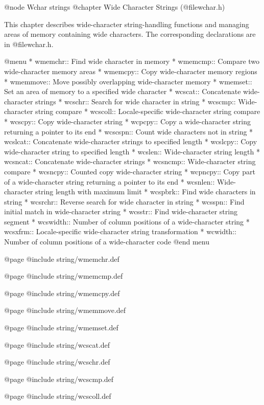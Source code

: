 @node Wchar strings
@chapter Wide Character Strings (@file{wchar.h})

This chapter describes wide-character string-handling functions and
managing areas of memory containing wide characters.  The corresponding 
declarations are in @file{wchar.h}.

@menu
* wmemchr::     Find wide character in memory
* wmemcmp::     Compare two wide-character memory areas
* wmemcpy::     Copy wide-character memory regions
* wmemmove::    Move possibly overlapping wide-character memory
* wmemset::     Set an area of memory to a specified wide character
* wcscat::      Concatenate wide-character strings
* wcschr::      Search for wide character in string
* wcscmp::      Wide-character string compare
* wcscoll::     Locale-specific wide-character string compare
* wcscpy::      Copy wide-character string
* wcpcpy::      Copy a wide-character string returning a pointer to its end
* wcscspn::     Count wide characters not in string
* wcslcat::     Concatenate wide-character strings to specified length
* wcslcpy::     Copy wide-character string to specified length
* wcslen::      Wide-character string length
* wcsncat::     Concatenate wide-character strings
* wcsncmp::     Wide-character string compare
* wcsncpy::     Counted copy wide-character string
* wcpncpy::     Copy part of a wide-character string returning a pointer to its end
* wcsnlen::     Wide-character string length with maximum limit
* wcspbrk::     Find wide characters in string
* wcsrchr::     Reverse search for wide character in string
* wcsspn::      Find initial match in wide-character string
* wcsstr::      Find wide-character string segment
* wcswidth::    Number of column positions of a wide-character string
* wcsxfrm::     Locale-specific wide-character string transformation
* wcwidth::     Number of column positions of a wide-character code
@end menu

@page
@include string/wmemchr.def

@page
@include string/wmemcmp.def

@page
@include string/wmemcpy.def

@page
@include string/wmemmove.def

@page
@include string/wmemset.def

@page
@include string/wcscat.def

@page
@include string/wcschr.def

@page
@include string/wcscmp.def

@page
@include string/wcscoll.def


